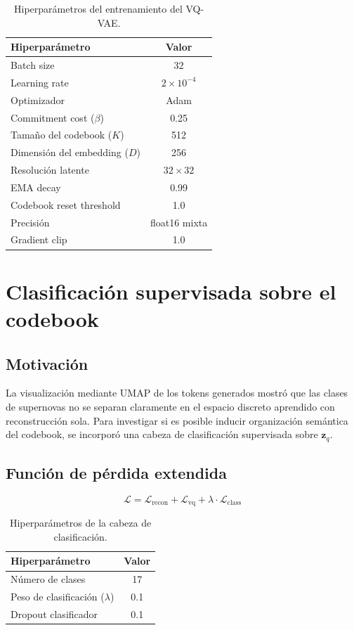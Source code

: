 \begin{table}[H]
\centering
\begin{tabular}{|l|c|}
\hline
\textbf{Hiperparámetro} & \textbf{Valor} \\
\hline
Batch size & 32 \\
Learning rate & $2 \times 10^{-4}$ \\
Optimizador & Adam \\
Commitment cost ($\beta$) & 0.25 \\
Tamaño del codebook ($K$) & 512 \\
Dimensión del embedding ($D$) & 256 \\
Resolución latente & $32 \times 32$ \\
EMA decay & 0.99 \\
Codebook reset threshold & 1.0 \\
Precisión & float16 mixta \\
Gradient clip & 1.0 \\
\hline
\end{tabular}
\caption{Hiperparámetros del entrenamiento del VQ-VAE.}
\label{tab:vqvae_config}
\end{table}


\section{Clasificación supervisada sobre el codebook}

\subsection{Motivación}

La visualización mediante UMAP de los tokens generados mostró que las clases de supernovas no se separan claramente en el espacio discreto aprendido con reconstrucción sola. Para investigar si es posible inducir organización semántica del codebook, se incorporó una cabeza de clasificación supervisada sobre $\mathbf{z}_q$.

\subsection{Función de pérdida extendida}

\begin{equation}
\mathcal{L} = \mathcal{L}_{\text{recon}} + \mathcal{L}_{\text{vq}} + \lambda \cdot \mathcal{L}_{\text{class}}
\end{equation}

\begin{table}[H]
\centering
\begin{tabular}{|l|c|}
\hline
\textbf{Hiperparámetro} & \textbf{Valor} \\
\hline
Número de clases & 17 \\
Peso de clasificación ($\lambda$) & 0.1 \\
Dropout clasificador & 0.1 \\
\hline
\end{tabular}
\caption{Hiperparámetros de la cabeza de clasificación.}
\label{tab:cls_config}
\end{table}

